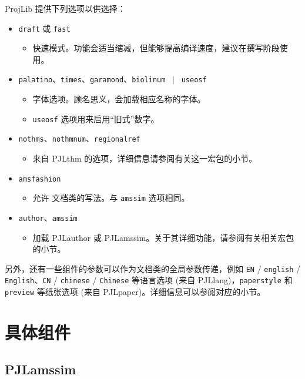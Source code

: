 \documentclass[Chinese,English,French,allowbf,puretext]{lebhart}
\providecommand{\ProjLibPackage}{\textsf{ProjLib}}
\providecommand{\PJLamssim}{\textsf{PJLamssim}}
\providecommand{\PJLauthor}{\textsf{PJLauthor}}
\providecommand{\PJLlang}{\textsf{PJLlang}}
\providecommand{\PJLpaper}{\textsf{PJLpaper}}
\providecommand{\PJLthm}{\textsf{PJLthm}}
\begin{document}
\ProjLibPackage{} 提供下列选项以供选择：
\begin{itemize}
    \item \texttt{draft} 或 \texttt{fast}
        \begin{itemize}
            \item 快速模式。功能会适当缩减，但能够提高编译速度，建议在撰写阶段使用。
        \end{itemize}
    \item \texttt{palatino}、\texttt{times}、\texttt{garamond}、\texttt{biolinum} ~$|$~ \texttt{useosf}
        \begin{itemize}
            \item 字体选项。顾名思义，会加载相应名称的字体。
            \item \texttt{useosf} 选项用来启用“旧式”数字。
        \end{itemize}
    \item \texttt{nothms}、\texttt{nothmnum}、\texttt{regionalref}
        \begin{itemize}
            \item 来自 \PJLthm{} 的选项，详细信息请参阅有关这一宏包的小节。
        \end{itemize}
    \item \texttt{amsfashion}
        \begin{itemize}
            \item 允许 \AmS{} 文档类的写法。与 \texttt{amssim} 选项相同。
        \end{itemize}
    \item \texttt{author}、\texttt{amssim}
        \begin{itemize}
            \item 加载 \PJLauthor{} 或 \PJLamssim{}。关于其详细功能，请参阅有关相关宏包的小节。
        \end{itemize}
\end{itemize}
另外，还有一些组件的参数可以作为文档类的全局参数传递，例如 \texttt{EN} / \texttt{english} / \texttt{English}、\texttt{CN} / \texttt{chinese} / \texttt{Chinese} 等语言选项 (来自 \PJLlang{})，\texttt{paperstyle} 和 \texttt{preview} 等纸张选项 (来自 \PJLpaper{})。详细信息可以参阅对应的小节。

\section{具体组件}

\subsection{PJLamssim}
\end{document}
